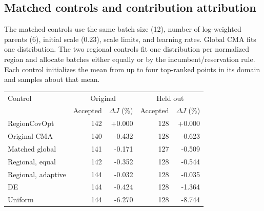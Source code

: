 \subsection{Matched controls and contribution attribution}

The matched controls use the same batch size (12), number of log-weighted parents (6), initial scale (0.23), scale limits, and learning rates. Global CMA fits one distribution. The two regional controls fit one distribution per normalized region and allocate batches either equally or by the incumbent/reservation rule. Each control initializes the mean from up to four top-ranked points in its domain and samples about that mean.

\begin{center}\begin{minipage}{\linewidth}\centering\small


\begin{tabular}{@{}lrrrr@{}}\toprule

Control & \multicolumn{2}{c}{Original} & \multicolumn{2}{c}{Held out}\\

 & Accepted & $\Delta J$ (\%) & Accepted & $\Delta J$ (\%)\\\midrule

RegionCovOpt & 142 & +0.000 & 128 & +0.000\\

Original CMA & 140 & -0.432 & 128 & -0.623\\

Matched global & 141 & -0.171 & 127 & -0.509\\

Regional, equal & 142 & -0.352 & 128 & -0.544\\

Regional, adaptive & 144 & -0.032 & 128 & -0.035\\

DE & 144 & -0.424 & 128 & -1.364\\

Uniform & 144 & -6.270 & 128 & -8.744\\

\bottomrule\end{tabular}\end{minipage}\end{center}

